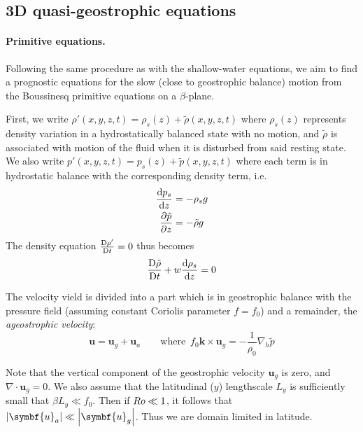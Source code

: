 \documentclass{jknotes}
\begin{document}
\subsection{3D quasi-geostrophic equations}
\paragraph{Primitive equations.} Following the same procedure as with the
shallow-water equations, we aim to find a prognostic equations for the slow
(close to geostrophic balance) motion from the Boussinesq primitive equations
on a $\beta$-plane.

First, we write $\rho'(x,y,z,t) = \rho_s(z) + \tilde{\rho}(x,y,z,t)$ where
$\rho_s(z)$ represents density variation in a hydrostatically balanced state
with no motion, and $\tilde{\rho}$ is associated with motion of the fluid when
it is disturbed from said resting state. We also write $p'(x,y,z,t) = p_s(z) +
\tilde{p}(x,y,z,t)$ where each term is in hydrostatic balance with the
corresponding density term, i.e.
\begin{align}
	\frac{\diffd p_s}{\diffd z} &= -\rho_s g \\
	\frac{\partial \tilde{p}}{\partial z} &= - \tilde{\rho} g
\end{align}
The density equation $\frac{\mathrm{D} \rho'}{\mathrm{D} t} = 0$ thus becomes
\begin{equation}
	\frac{\diffD \tilde{\rho}}{\diffD t} + w \frac{\diffd \rho_s}{\diffd z} =
	0
\end{equation}

The velocity vield is divided into a part which is in geostrophic balance with
the pressure field (assuming constant Coriolis parameter $f=f_0$) and a remainder, the
\emph{ageostrophic velocity}:
\begin{equation}
	\symbf{u} = \symbf{u}_g + \symbf{u}_a \hspace{2em} \text{where} \,\,\, f_0 \symbf{k}
	\times \symbf{u}_g = -\frac{1}{\rho_0} \nabla_h \tilde{p}
\end{equation}

Note that the vertical component of the geostrophic velocity $\symbf{u}_g$ is
zero, and $\nabla \cdot \symbf{u}_g = 0$. We also assume that the latitudinal
($y$) lengthscale $L_y$ is sufficiently small that $\beta L_y \ll f_0$. Then
if $Ro \ll 1$, it follows that $\abs{\symbf{u}_a} \ll \abs{\symbf{u}_g}$.
Thus we are domain limited in latitude.
\end{document}
